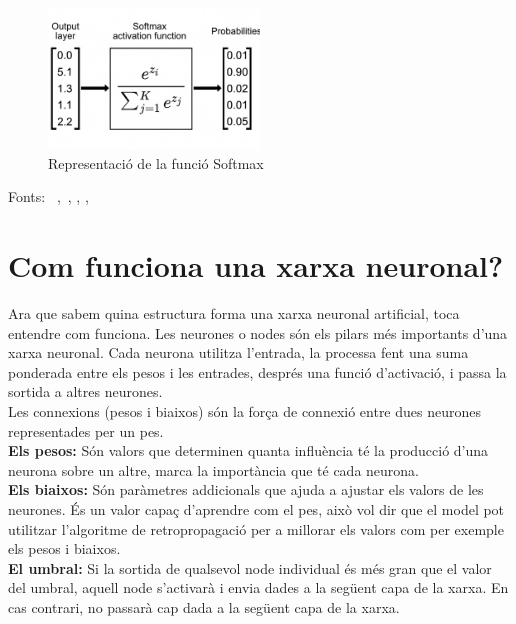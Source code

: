 \begin{enumerate}
    \begin{figure}[H]
        \centering
        \includegraphics[width=0.5\textwidth]{./figures/representacio_Softmax.png}
        \caption{Representació de la funció Softmax}
    \end{figure}
\end{enumerate}

Fonts: ~\cite{Hidden_layer},~\cite{Jacar}, \cite{FuncióD'activació}, \cite{Softmax}, \cite{datacamp}

\section{Com funciona una xarxa neuronal?}\label{sec:3.8}

Ara que sabem quina estructura forma una xarxa neuronal artificial, toca entendre com funciona. Les neurones o nodes són els pilars més importants d'una xarxa neuronal. Cada neurona utilitza l'entrada, la processa fent una suma ponderada entre els pesos i les entrades, després una funció d'activació, i passa la sortida a altres neurones.\\

Les connexions (pesos i biaixos) són la força de connexió entre dues neurones representades per un pes.\\

\textbf{Els pesos:} Són valors que determinen quanta influència té la producció d'una neurona sobre un altre, marca la importància que té cada neurona.\\

\textbf{Els biaixos:} Són paràmetres addicionals que ajuda a ajustar els valors de les neurones. És un valor capaç d'aprendre com el pes, això vol dir que el model pot utilitzar l'algoritme de retropropagació per a millorar els valors com per exemple els pesos i biaixos.\\

\textbf{El umbral:} Si la sortida de qualsevol node individual és més gran que el valor del umbral, aquell node s'activarà i envia dades a la següent capa de la xarxa. En cas contrari, no passarà cap dada a la següent capa de la xarxa.\\

